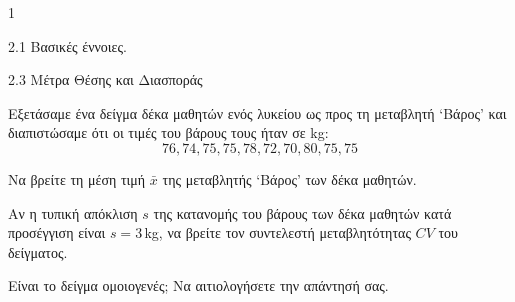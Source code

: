 \begin{ylh}{1}
    \item 2.1 Βασικές έννοιες.
    \item 2.3 Μέτρα Θέσης και Διασποράς
\end{ylh}
Εξετάσαμε ένα δείγμα δέκα μαθητών ενός λυκείου ως προς τη μεταβλητή ‘Βάρος’ και διαπιστώσαμε ότι οι τιμές του βάρους τους ήταν σε kg:
\[
76, 74, 75, 75, 78, 72, 70, 80, 75, 75
\]
\begin{alist}
\item Να βρείτε τη μέση τιμή $\bar{x}$ της μεταβλητής ‘Βάρος’ των δέκα μαθητών. 
\item Αν η τυπική απόκλιση $s$ της κατανομής του βάρους των δέκα μαθητών κατά προσέγγιση είναι $s=3\,$kg, να βρείτε τον συντελεστή μεταβλητότητας $CV$ του δείγματος. 
\item Είναι το δείγμα ομοιογενές; Να αιτιολογήσετε την απάντησή σας. 
\end{alist}

